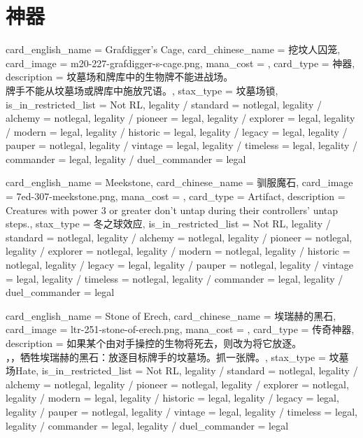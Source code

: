 \documentclass[lang = cn, color = black, 10pt]{AllThatStax}
\begin{document}
\section{神器}

\card
{
	card_english_name = {Grafdigger's Cage},
	card_chinese_name = {挖坟人囚笼},
	card_image = m20-227-grafdigger-s-cage.png,
	mana_cost = ,
	card_type = 神器,
	description = {坟墓场和牌库中的生物牌不能进战场。\\
		牌手不能从坟墓场或牌库中施放咒语。},
	stax_type = 坟墓场锁,
	is_in_restricted_list = Not RL,
	legality / standard = notlegal,
	legality / alchemy = notlegal,
	legality / pioneer = legal,
	legality / explorer = legal,
	legality / modern = legal,
	legality / historic = legal,
	legality / legacy = legal,
	legality / pauper = notlegal,
	legality / vintage = legal,
	legality / timeless = legal,
	legality / commander = legal,
	legality / duel_commander = legal
}

\card
{
	card_english_name = {Meekstone},
	card_chinese_name = {驯服魔石},
	card_image = 7ed-307-meekstone.png,
	mana_cost = ,
	card_type = Artifact,
	description = {Creatures with power 3 or greater don't untap during their controllers' untap steps.},
	stax_type = 冬之球效应,
	is_in_restricted_list = Not RL,
	legality / standard = notlegal,
	legality / alchemy = notlegal,
	legality / pioneer = notlegal,
	legality / explorer = notlegal,
	legality / modern = notlegal,
	legality / historic = notlegal,
	legality / legacy = legal,
	legality / pauper = notlegal,
	legality / vintage = legal,
	legality / timeless = notlegal,
	legality / commander = legal,
	legality / duel_commander = legal
}

\card
{
	card_english_name = {Stone of Erech},
	card_chinese_name = {埃瑞赫的黑石},
	card_image = ltr-251-stone-of-erech.png,
	mana_cost = ,
	card_type = 传奇神器,
	description = {如果某个由对手操控的生物将死去，则改为将它放逐。\\
		，，牺牲埃瑞赫的黑石：放逐目标牌手的坟墓场。抓一张牌。},
	stax_type = 坟墓场Hate,
	is_in_restricted_list = Not RL,
	legality / standard = notlegal,
	legality / alchemy = notlegal,
	legality / pioneer = notlegal,
	legality / explorer = notlegal,
	legality / modern = legal,
	legality / historic = legal,
	legality / legacy = legal,
	legality / pauper = notlegal,
	legality / vintage = legal,
	legality / timeless = legal,
	legality / commander = legal,
	legality / duel_commander = legal
}
\end{document}
